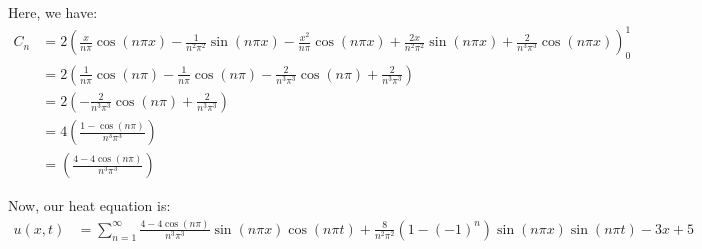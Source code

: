 Here, we have:
%
\begin{align}
  C_n & = 2 \left(
  \frac{x}{n \pi} \cos(n \pi x) - \frac{1}{n^2 \pi^2} \sin(n \pi x) -
  \frac{x^2}{n \pi} \cos(n \pi x) + \frac{2x}{n^2 \pi^2} \sin(n \pi x) + \frac{2}{n^3 \pi^3} \cos(n \pi x)
  \right)^1_0\\
  & = 2 \left( \frac{1}{n \pi} \cos(n \pi) - \frac{1}{n \pi} \cos(n \pi) - \frac{2}{n^3 \pi^3} \cos(n \pi) + \frac{2}{n^3 \pi^3} \right)\\
  & = 2 \left( - \frac{2}{n^3 \pi^3} \cos(n \pi) + \frac{2}{n^3 \pi^3} \right)\\
  & = 4 \left(\frac{1 - \cos(n \pi)}{n^3 \pi^3} \right)\\
  & = \left(\frac{4 - 4\cos(n \pi)}{n^3 \pi^3} \right)
\end{align}

Now, our heat equation is:
%
\begin{align}
  u(x, t) & =
  \sum^\infty_{n = 1} \frac{4 - 4\cos(n \pi)}{n^3 \pi^3} \sin(n \pi x) \cos(n \pi t) + \frac{8}{n^2 \pi^2} (1 - (-1)^n) \sin(n \pi x) \sin(n \pi t) - 3x + 5
\end{align}
